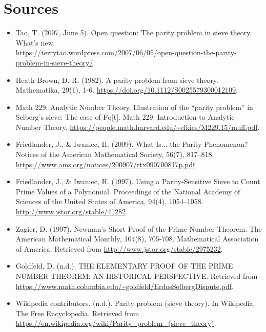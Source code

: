 \documentclass[10pt]{extarticle}
\begin{document}
\section{Sources}
\begin{itemize}
  \item Tao, T. (2007, June 5). Open question: The parity problem in sieve theory. What's new.\\  \url{https://terrytao.wordpress.com/2007/06/05/open-question-the-parity-problem-in-sieve-theory/}.
  \item Heath-Brown, D. R. (1982). A parity problem from sieve theory. Mathematika, 29(1), 1-6. \url{https://doi.org/10.1112/S0025579300012109}.
  \item Math 229: Analytic Number Theory. Illustration of the “parity problem” in Selberg’s sieve: The case of Fq[t]. Math 229: Introduction to Analytic Number Theory. \url{https://people.math.harvard.edu/~elkies/M229.15/muff.pdf}.
  \item Friedlander, J., \& Iwaniec, H. (2009). What Is... the Parity Phenomenon? Notices of the American Mathematical Society, 56(7), 817–818. \url{https://www.ams.org/notices/200907/rtx090700817p.pdf}.
  \item Friedlander, J., \& Iwaniec, H. (1997). Using a Parity-Sensitive Sieve to Count Prime Values of a Polynomial. Proceedings of the National Academy of Sciences of the United States of America, 94(4), 1054–1058. \url{http://www.jstor.org/stable/41282}.
  \item Zagier, D. (1997). Newman's Short Proof of the Prime Number Theorem. The American Mathematical Monthly, 104(8), 705-708. Mathematical Association of America. Retrieved from \url{http://www.jstor.org/stable/2975232}.
  \item Goldfeld, D. (n.d.). THE ELEMENTARY PROOF OF THE PRIME NUMBER THEOREM: AN HISTORICAL PERSPECTIVE. Retrieved from \url{https://www.math.columbia.edu/~goldfeld/ErdosSelbergDispute.pdf}.
  \item Wikipedia contributors. (n.d.). Parity problem (sieve theory). In Wikipedia, The Free Encyclopedia. Retrieved from \url{https://en.wikipedia.org/wiki/Parity_problem_(sieve_theory)}.
  \end{itemize}
\end{document}

